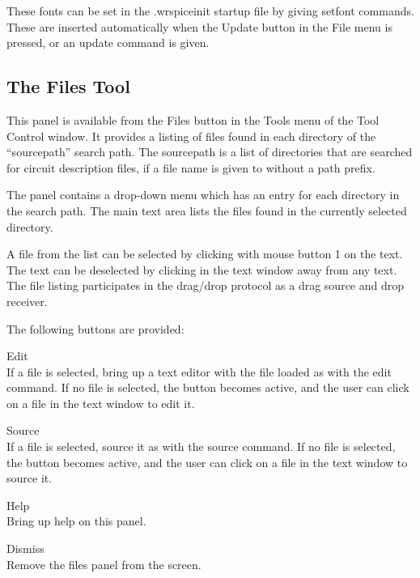 These fonts can be set in the {\vt .wrspiceinit} startup file by
giving {\cb setfont} commands.  These are inserted automatically when
the {\cb Update} button in the {\cb File} menu is pressed, or an {\cb
update} command is given.

\subsection{The Files Tool}
\label{filespanel}

This panel is available from the {\cb Files} button in the {\cb Tools}
menu of the {\cb Tool Control} window.  It provides a listing of files
found in each directory of the ``{\vt sourcepath}'' search path.  The
{\et sourcepath} is a list of directories that are searched for
circuit description files, if a file name is given to {\WRspice}
without a path prefix.

The panel contains a drop-down menu which has an entry for each
directory in the search path.  The main text area lists the files
found in the currently selected directory.

A file from the list can be selected by clicking with mouse button 1
on the text.  The text can be deselected by clicking in the text
window away from any text.  The file listing participates in the
drag/drop protocol as a drag source and drop receiver.

The following buttons are provided:

\begin{description}
\item{\cb Edit}\\
    If a file is selected, bring up a text editor with the
    file loaded as with the {\cb edit} command.  If
    no file is selected, the button becomes active, and the user
    can click on a file in the text window to edit it.
\item{\cb Source}\\
    If a file is selected, source it as with the {\cb source}
    command.  If no file is selected, the button becomes active,
    and the user can click on a file in the text window to source
    it.
\item{\cb Help}\\
    Bring up help on this panel.
\item{\cb Dismiss}\\
    Remove the files panel from the screen.
\end{description}

